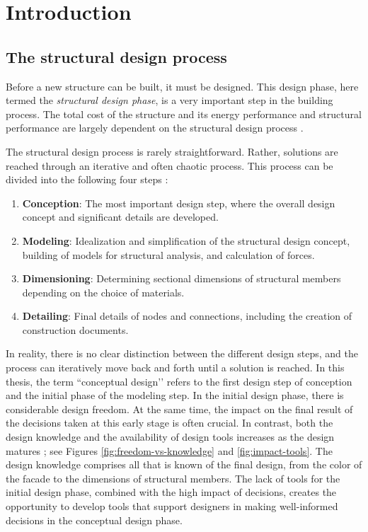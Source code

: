 \chapter{Introduction}
\label{ch:Introduction}
\section{The structural design process}
Before a new structure can be built, it must be designed. This design phase, here termed the \textit{structural design phase}, is a very important step in the building process. The total cost of the structure and its energy performance and structural performance are largely dependent on the structural design process \cite{Mueller2014}. 

The structural design process is rarely straightforward. Rather, solutions are reached through an iterative and often chaotic process. This process can be divided into the following four steps \cite{schlaich2006challenges}:

\begin{enumerate}  
\item \textbf{Conception}: The most important design step, where the overall design concept and significant details are developed.
\item \textbf{Modeling}: Idealization and simplification of the structural design concept, building of models for structural analysis, and calculation of forces.
\item \textbf{Dimensioning}: Determining sectional dimensions of structural members depending on the choice of materials.
\item \textbf{Detailing}: Final details of nodes and connections, including the creation of construction documents.
\end{enumerate}

In reality, there is no clear distinction between the different design steps, and the process can iteratively move back and forth until a solution is reached. In this thesis, the term ``conceptual design’’ refers to the first design step of conception and the initial phase of the modeling step. In the initial design phase, there is considerable design freedom. At the same time, the impact on the final result of the decisions taken at this early stage is often crucial. In contrast, both the design knowledge and the availability of design tools increases as the design matures \cite{schlaich2006challenges} \cite{Hsu2000}; see Figures \ref{fig:freedom-vs-knowledge} and \ref{fig:impact-tools}. The design knowledge comprises all that is known of the final design, from the color of the facade to the dimensions of structural members. The lack of tools for the initial design phase, combined with the high impact of decisions, creates the opportunity to develop tools that support designers in making well-informed decisions in the conceptual design phase.

